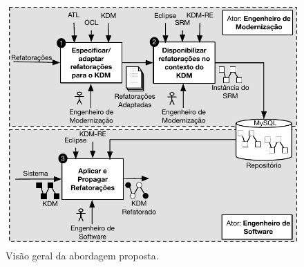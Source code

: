 
\begin{figure}[h]
	\centering
	\caption{Visão geral da abordagem proposta.}
	\label{fig:abordagem_kdm_tese_processo}
	\includegraphics[scale=0.8]{images/ImagemIntroducaoAbordagemNova}
	\fautor
\end{figure}

